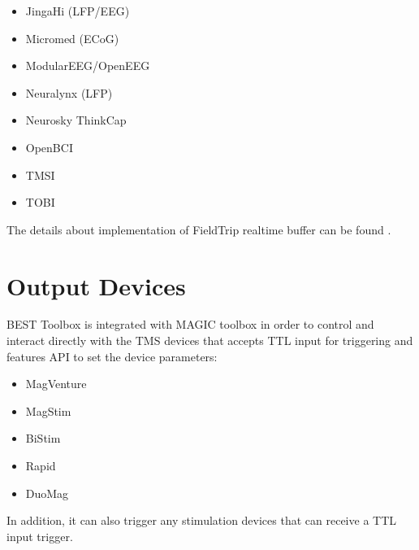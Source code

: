 \documentclass[letterpaper,10pt,english]{sphinxmanual}
\begin{document}
\begin{itemize}
\item {} 
\sphinxAtStartPar
Jinga\sphinxhyphen{}Hi (LFP/EEG)

\item {} 
\sphinxAtStartPar
Micromed (ECoG)

\item {} 
\sphinxAtStartPar
ModularEEG/OpenEEG

\item {} 
\sphinxAtStartPar
Neuralynx (LFP)

\item {} 
\sphinxAtStartPar
Neurosky ThinkCap

\item {} 
\sphinxAtStartPar
OpenBCI

\item {} 
\sphinxAtStartPar
TMSI

\item {} 
\sphinxAtStartPar
TOBI

\end{itemize}

\sphinxAtStartPar
The details about implementation of FieldTrip real\sphinxhyphen{}time buffer can be found .


\section{Output Devices}
\label{\detokenize{index:output-devices}}
\sphinxAtStartPar
BEST Toolbox is integrated with MAGIC toolbox in order to control and interact directly with the TMS devices that accepts TTL input for triggering and features API to set the device parameters:
\begin{itemize}
\item {} 
\sphinxAtStartPar
MagVenture

\item {} 
\sphinxAtStartPar
MagStim

\item {} 
\sphinxAtStartPar
BiStim

\item {} 
\sphinxAtStartPar
Rapid

\item {} 
\sphinxAtStartPar
DuoMag

\end{itemize}

\sphinxAtStartPar
In addition, it can also trigger any stimulation devices that can receive a TTL input trigger.
\end{document}
